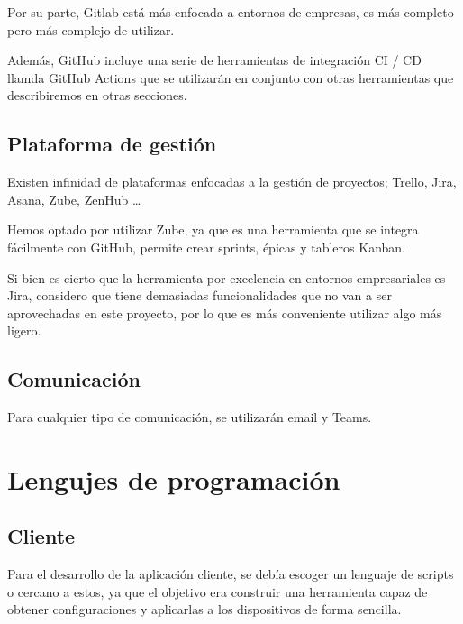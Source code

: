 Por su parte, Gitlab está más enfocada a entornos de empresas, es más completo pero más complejo de utilizar.

Además, GitHub incluye una serie de herramientas de integración CI / CD llamda GitHub Actions que se utilizarán en
conjunto con otras herramientas que describiremos en otras secciones.

\subsection{Plataforma de gestión}\label{subsec:plataforma}

Existen infinidad de plataformas enfocadas a la gestión de proyectos; Trello, Jira, Asana, Zube, ZenHub \ldots

Hemos optado por utilizar Zube\cite{zube:gettingstarted}, ya que es una herramienta que se integra fácilmente con GitHub, permite crear
sprints, épicas y tableros Kanban.

Si bien es cierto que la herramienta por excelencia en entornos empresariales es Jira, considero que tiene demasiadas
funcionalidades que no van a ser aprovechadas en este proyecto, por lo que es más conveniente utilizar algo más ligero.

\subsection{Comunicación}\label{subsec:comunicacion}

Para cualquier tipo de comunicación, se utilizarán email y Teams.

\section{Lengujes de programación}\label{sec:lenguajes}

\subsection{Cliente}\label{subsec:cliente}

Para el desarrollo de la aplicación cliente, se debía escoger un lenguaje de scripts o cercano a estos, ya que el objetivo
era construir una herramienta capaz de obtener configuraciones y aplicarlas a los dispositivos de forma sencilla.

